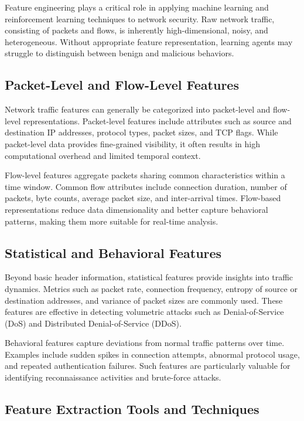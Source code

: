 \documentclass[12pt,a4paper]{report}
\begin{document}
Feature engineering plays a critical role in applying machine learning and reinforcement learning techniques to network security.
Raw network traffic, consisting of packets and flows, is inherently high-dimensional, noisy, and heterogeneous.
Without appropriate feature representation, learning agents may struggle to distinguish between benign and malicious behaviors.

\subsection{Packet-Level and Flow-Level Features}

Network traffic features can generally be categorized into packet-level and flow-level representations.
Packet-level features include attributes such as source and destination IP addresses, protocol types, packet sizes, and TCP flags.
While packet-level data provides fine-grained visibility, it often results in high computational overhead and limited temporal context.

Flow-level features aggregate packets sharing common characteristics within a time window.
Common flow attributes include connection duration, number of packets, byte counts, average packet size, and inter-arrival times.
Flow-based representations reduce data dimensionality and better capture behavioral patterns, making them more suitable for real-time analysis.

\subsection{Statistical and Behavioral Features}

Beyond basic header information, statistical features provide insights into traffic dynamics.
Metrics such as packet rate, connection frequency, entropy of source or destination addresses, and variance of packet sizes are commonly used.
These features are effective in detecting volumetric attacks such as Denial-of-Service (DoS) and Distributed Denial-of-Service (DDoS).

Behavioral features capture deviations from normal traffic patterns over time.
Examples include sudden spikes in connection attempts, abnormal protocol usage, and repeated authentication failures.
Such features are particularly valuable for identifying reconnaissance activities and brute-force attacks.

\subsection{Feature Extraction Tools and Techniques}
\end{document}
